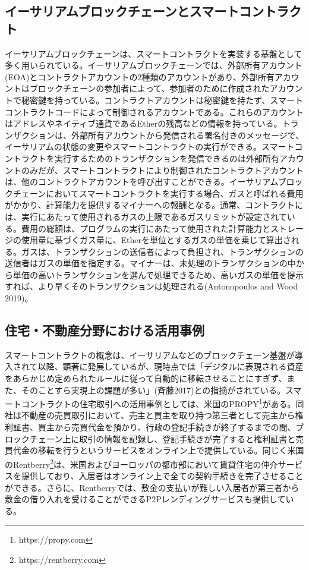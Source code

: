 \documentclass[a4paper,fontsize=11pt,report,notitlepage,line_length=38zw,number_of_lines=40,dvipdfmx]{jlreq}
\begin{document}
\subsection{イーサリアムブロックチェーンとスマートコントラクト}
イーサリアムブロックチェーンは、スマートコントラクトを実装する基盤として多く用いられている。イーサリアムブロックチェーンでは、外部所有アカウント(EOA)とコントラクトアカウントの2種類のアカウントがあり、外部所有アカウントはブロックチェーンの参加者によって、参加者のために作成されたアカウントで秘密鍵を持っている。コントラクトアカウントは秘密鍵を持たず、スマートコントラクトコードによって制御されるアカウントである。これらのアカウントはアドレスやネイティブ通貨であるEtherの残高などの情報を持っている。トランザクションは、外部所有アカウントから発信される署名付きのメッセージで、イーサリアムの状態の変更やスマートコントラクトの実行ができる。スマートコントラクトを実行するためのトランザクションを発信できるのは外部所有アカウントのみだが、スマートコントラクトにより制御されたコントラクトアカウントは、他のコントラクトアカウントを呼び出すことができる。イーサリアムブロックチェーンにおいてスマートコントラクトを実行する場合、ガスと呼ばれる費用がかかり、計算能力を提供するマイナーへの報酬となる。通常、コントラクトには、実行にあたって使用されるガスの上限であるガスリミットが設定されている。費用の総額は、プログラムの実行にあたって使用された計算能力とストレージの使用量に基づくガス量に、Etherを単位とするガスの単価を乗じて算出される。ガスは、トランザクションの送信者によって負担され、トランザクションの送信者はガスの単価を指定する。マイナーは、未処理のトランザクションの中から単価の高いトランザクションを選んで処理できるため、高いガスの単価を提示すれば、より早くそのトランザクションは処理される(Antonopoulos and Wood 2019)\cite{antonopoulos2019}。

\subsection{住宅・不動産分野における活用事例}
スマートコントラクトの概念は、イーサリアムなどのブロックチェーン基盤が導入されて以降、顕著に発展しているが、現時点では「デジタルに表現される資産をあらかじめ定められたルールに従って自動的に移転させることにすぎず、また、そのことすら実現上の課題が多い」(斉藤2017)\cite{saito2017}との指摘がされている。スマートコントラクトの住宅取引への活用事例としては、米国のPROPY\footnote{https://propy.com}がある。同社は不動産の売買取引において、売主と買主を取り持つ第三者として売主から権利証書、買主から売買代金を預かり、行政の登記手続きが終了するまでの間、ブロックチェーン上に取引の情報を記録し、登記手続きが完了すると権利証書と売買代金の移転を行うというサービスをオンライン上で提供している。同じく米国のRentberry\footnote{https://rentberry.com}は、米国およびヨーロッパの都市部において賃貸住宅の仲介サービスを提供しており、入居者はオンライン上で全ての契約手続きを完了させることができる。さらに、Rentberryでは、敷金の支払いが難しい入居者が第三者から敷金の借り入れを受けることができるP2Pレンディングサービスも提供している。
\end{document}
